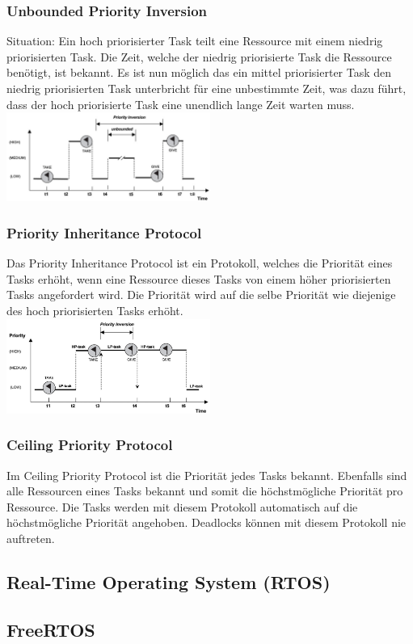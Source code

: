 \subsubsection{Unbounded Priority Inversion}
Situation: Ein hoch priorisierter Task teilt eine Ressource mit einem niedrig priorisierten Task. Die Zeit, welche der niedrig priorisierte Task die Ressource benötigt, ist bekannt. Es ist nun möglich das ein mittel priorisierter Task den niedrig priorisierten Task unterbricht für eine unbestimmte Zeit, was dazu führt, dass der hoch priorisierte Task eine unendlich lange Zeit warten muss. \\
\includegraphics[width=0.5\textwidth]{images/Betriebssysteme/unbounded_priority.png}

\subsubsection{Priority Inheritance Protocol}
Das Priority Inheritance Protocol ist ein Protokoll, welches die Priorität eines Tasks erhöht, wenn eine Ressource dieses Tasks von einem höher priorisierten Tasks angefordert wird. Die Priorität wird auf die selbe Priorität wie diejenige des hoch priorisierten Tasks erhöht. \\
\includegraphics[width=0.5\textwidth]{images/Betriebssysteme/priority_inheritance.png}

\subsubsection{Ceiling Priority Protocol}
Im Ceiling Priority Protocol ist die Priorität jedes Tasks bekannt. Ebenfalls sind alle Ressourcen eines Tasks bekannt und somit die höchstmögliche Priorität pro Ressource. Die Tasks werden mit diesem Protokoll automatisch auf die höchstmögliche Priorität angehoben. Deadlocks können mit diesem Protokoll nie auftreten.

\subsection{Real-Time Operating System (RTOS)}

\subsection{FreeRTOS}
